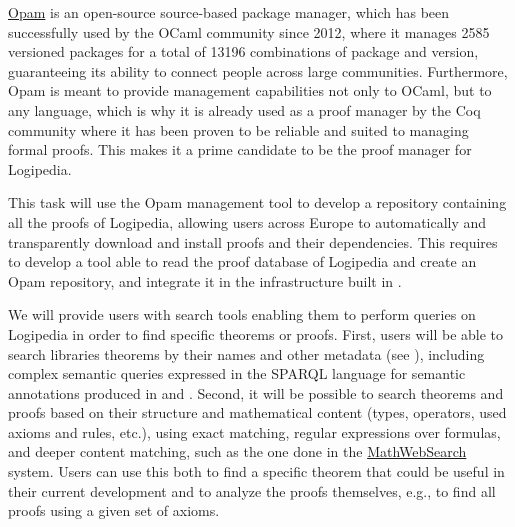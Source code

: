 \begin{workpackage}[id=access,type=RTD,wphases=1-48,
  short=Access,%
  title={Access},
  lead=Inr,InrRM=48,OcaRM=6,EduRM=12]
\begin{tasklist}
\begin{task}[id=opam,
      title=Giving access to the infrastructure in proof systems,
      shorttitle=Syst.,
      lead=Oca,OcaRM=6,wphases=15-24]
    \href{https://opam.ocaml.org/}{Opam} is an open-source source-based package manager,
    which has been successfully used by the OCaml community since
    2012, where it manages 2585 versioned packages for a total of
    13196 combinations of package and version, guaranteeing its
    ability to connect people across large communities. Furthermore,
    Opam is meant to provide management capabilities not only to
    OCaml, but to any language, which is why it is already used as a
    proof manager by the Coq community where it has been proven to be
    reliable and suited to managing formal proofs. This makes it a
    prime candidate to be the proof manager for Logipedia.

    This task will use the Opam management tool to develop a
    repository containing all the proofs of Logipedia, allowing users
    across Europe to automatically and transparently download and
    install proofs and their dependencies. This
    requires to develop a tool able to read the proof
    database of Logipedia and create an Opam repository,
    and integrate it in the infrastructure built in .
  \end{task}

  \begin{task}[id=search,
      title=Providing search tools,
      shorttitle=Search,
      lead=Inr,InrRM=18,wphases=15-33]
    We will provide users with search tools enabling them to perform
    queries on Logipedia in order to find specific theorems or proofs.
    First, users will be able to search libraries theorems by their
    names and other metadata (see ),
    including complex semantic queries expressed in the SPARQL
    language for semantic annotations produced in
     and
    . Second, it will be possible to
    search theorems and proofs based on their structure and
    mathematical content (types, operators, used axioms and rules,
    etc.), using exact matching, regular expressions over formulas, and
    deeper content matching, such as the one done in the
    \hyperlink{https://kwarc.info/systems/mws/}{MathWebSearch}
    system. Users can use this both to find a specific theorem that
    could be useful in their current development and to analyze the
    proofs themselves, e.g., to find all proofs using a given set of
    axioms. 
  \end{task}


\end{tasklist}
\end{workpackage}
